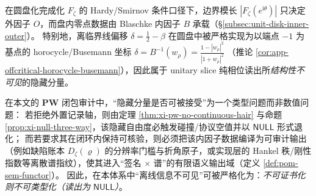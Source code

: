 \begin{remark}\label{rem:xi-inner-factor-auditability-null}
在圆盘化完成化 \(F_{\zeta}\) 的 Hardy/Smirnov 条件口径下，边界模长 \(|F_{\zeta}(e^{\mathrm{i}\theta})|\) 只决定外因子 \(O\)，而盘内零点数据由 Blaschke 内因子 \(B\) 承载（\S\ref{subsec:unit-disk-inner-outer}）。
特别地，离临界线偏移 \(\delta=\tfrac12-\beta\) 在圆盘中被严格实现为以端点 \(-1\) 为基点的 horocycle/Busemann 坐标
\(
\delta=B^{-1}(w_{\rho})=\frac{1-|w_{\rho}|^{2}}{|1+w_{\rho}|^{2}}
\)
（推论 \ref{cor:app-offcritical-horocycle-busemann}），因此属于 unitary slice 纯相位读出所\emph{结构性不可见}的隐藏分量。
\par
在本文的 \(\mathbf{PW}\) 闭包审计中，“隐藏分量是否可被接受”为一个类型问题而非数值问题：
若拒绝外置记录轴，则由定理 \ref{thm:xi-pw-no-continuous-hair} 与命题 \ref{prop:xi-null-three-way}，该隐藏自由度必触发碰撞/协议空值并以 \(\mathsf{NULL}\) 形式退化；
而若要求其在闭环内保持可核验，则必须把该内因子数据编译为可审计输出（例如缺陷账本 \(D_{\zeta}(\varrho)\) 的分辨率门槛与折角原子，或实现层的 Hankel 秩/刚性指数等离散谱指纹），使其进入“签名 \(\times\) 谱”的有限语义输出域（定义 \ref{def:pom-sem-functor}）。
因此，在本体系中“离线信息不可见”可被严格化为：\emph{不可证书化则不可类型化（读出为 \(\mathsf{NULL}\)）}。
\end{remark}

